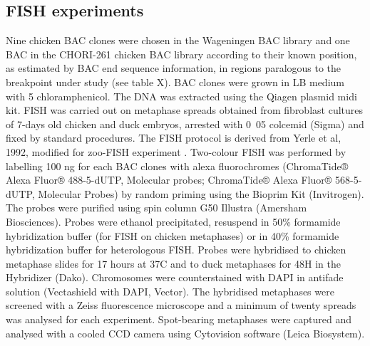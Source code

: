 \documentclass[10pt,letterpaper]{article}
\begin{document}
\subsection*{FISH experiments}

Nine chicken BAC clones were chosen in the Wageningen BAC library \cite{Crooijmans2000} and one BAC in the CHORI-261 chicken BAC library \cite{Zimmer1997} according to their known position, as estimated by BAC end sequence information, in regions paralogous to the breakpoint under study (see table X). BAC clones were grown in LB medium with \unit{5}{\micro\gram\per\milli\litre} chloramphenicol. The DNA was extracted using the Qiagen plasmid midi kit.
FISH was carried out on metaphase spreads obtained from fibroblast cultures of 7-days old chicken and duck embryos, arrested with  \unit{0.05}{\micro\gram\per\milli\litre} colcemid (Sigma) and fixed by standard procedures. The FISH protocol is derived from Yerle et al, 1992, modified for zoo-FISH experiment \cite{Fillon2007}. Two-colour FISH was performed by labelling 100 ng for each BAC clones with alexa fluorochromes (ChromaTide® Alexa Fluor® 488-5-dUTP, Molecular probes; ChromaTide® Alexa Fluor® 568-5-dUTP, Molecular Probes) by random priming using the Bioprim Kit (Invitrogen). The probes were purified using spin column G50 Illustra (Amersham Biosciences). Probes were ethanol precipitated, resuspend in 50\% formamide hybridization buffer (for FISH on chicken metaphases) or in 40\% formamide hybridization buffer for heterologous FISH. Probes were hybridised to chicken metaphase slides for 17 hours at 37\degree C and to duck metaphases for 48H in the Hybridizer (Dako). Chromosomes were counterstained with DAPI in antifade solution (Vectashield with DAPI, Vector). The hybridised metaphases were screened with a Zeiss fluorescence microscope and a minimum of twenty spreads was analysed for each experiment. Spot-bearing metaphases were captured and analysed with a cooled CCD camera using Cytovision software (Leica Biosystem).




\newpage
\end{document}
